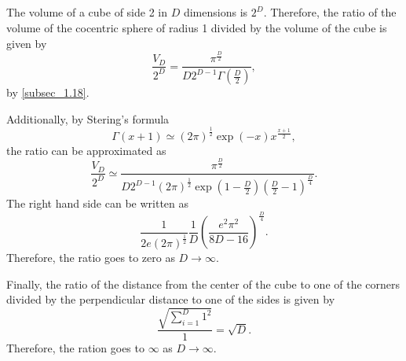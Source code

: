 \subsection{}
The volume of a cube of side 2 in $D$ dimensions is $2 ^ D$. 
Therefore, the ratio of the volume of the cocentric sphere of radius 1 divided by the volume of the cube is given by
%
\begin{equation}
\frac{V_D}{2 ^ D} = \frac{\pi ^ \frac{D}{2}}{D 2 ^ {D - 1} \Gamma \left( \frac{D}{2} \right)},
\end{equation}
%
by \ref{subsec_1.18}.

Additionally, by Stering's formula
%
\begin{equation}
\Gamma(x + 1) \simeq (2 \pi) ^ \frac{1}{2} \exp(- x) x ^ {\frac{x + 1}{2}},
\end{equation}
%
the ratio can be approximated as
%
\begin{equation}
\frac{V_D}{2 ^ D} \simeq \frac{\pi ^ \frac{D}{2}}{D 2 ^ {D - 1} (2 \pi) ^ \frac{1}{2} \exp \left( 1 - \frac{D}{2} \right) \left( \frac{D}{2} - 1 \right) ^ \frac{D}{4}}.
\end{equation}
%
The right hand side can be written as 
%
\begin{equation}
\frac{1}{2 e (2 \pi) ^ \frac{1}{2}} \frac{1}{D} \left( \frac{e ^ 2 \pi ^ 2}{ 8 D - 16} \right) ^ \frac{D}{4}.
\end{equation}
%
Therefore, the ratio goes to zero as $D \to \infty$.

Finally, the ratio of the distance from the center of the cube to one of the corners divided by the perpendicular distance to one of the sides is given by
%
\begin{equation}
\frac{\sqrt{\sum_{i = 1}^{D} 1 ^ 2}}{1} = \sqrt{D}.
\end{equation}
%
Therefore, the ration goes to $\infty$ as $D \to \infty$.


